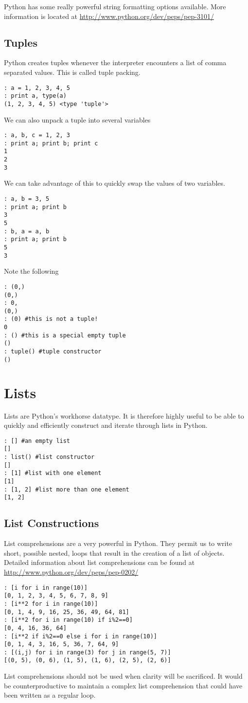 Python has some really powerful string formatting options available.  More information is located at \url{http://www.python.org/dev/peps/pep-3101/}

\subsection*{Tuples}
Python creates tuples whenever the interpreter encounters a list of comma separated values.  This is called tuple packing.
\begin{lstlisting}
: a = 1, 2, 3, 4, 5
: print a, type(a)
(1, 2, 3, 4, 5) <type 'tuple'>
\end{lstlisting}
We can also unpack a tuple into several variables
\begin{lstlisting}
: a, b, c = 1, 2, 3
: print a; print b; print c
1
2
3
\end{lstlisting}
We can take advantage of this to quickly swap the values of two variables.
\begin{lstlisting}
: a, b = 3, 5
: print a; print b
3
5
: b, a = a, b
: print a; print b
5
3
\end{lstlisting}
Note the following
\begin{lstlisting}
: (0,)
(0,)
: 0,
(0,)
: (0) #this is not a tuple!
0
: () #this is a special empty tuple
()
: tuple() #tuple constructor
()
\end{lstlisting}

\section*{Lists}
Lists are Python's workhorse datatype.  It is therefore highly useful to be able to quickly and efficiently construct and iterate through lists in Python.
\begin{lstlisting}
: [] #an empty list
[]
: list() #list constructor
[]
: [1] #list with one element
[1]
: [1, 2] #list more than one element
[1, 2]
\end{lstlisting}

\subsection*{List Constructions}
List comprehensions are a very powerful in Python.  They permit us to write short, possible nested, loops that result in the creation of a list of objects.  Detailed information about list comprehensions can be found at \url{http://www.python.org/dev/peps/pep-0202/}
\begin{lstlisting}
: [i for i in range(10)]
[0, 1, 2, 3, 4, 5, 6, 7, 8, 9]
: [i**2 for i in range(10)]
[0, 1, 4, 9, 16, 25, 36, 49, 64, 81]
: [i**2 for i in range(10) if i%2==0]
[0, 4, 16, 36, 64]
: [i**2 if i%2==0 else i for i in range(10)]
[0, 1, 4, 3, 16, 5, 36, 7, 64, 9]
: [(i,j) for i in range(3) for j in range(5, 7)]
[(0, 5), (0, 6), (1, 5), (1, 6), (2, 5), (2, 6)]
\end{lstlisting}
List comprehensions should not be used when clarity will be sacrificed.  It would be counterproductive to maintain a complex list comprehension that could have been written as a regular  loop.

